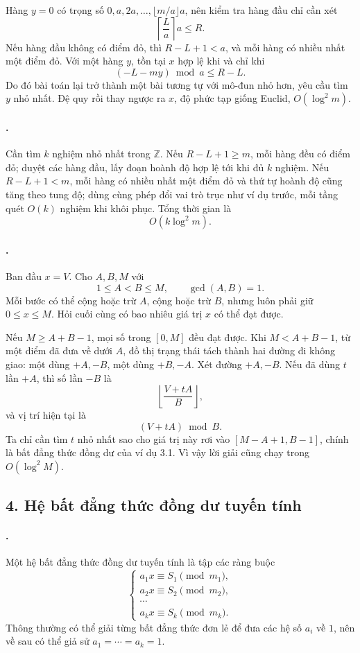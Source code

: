 \documentclass[11pt]{article}
\begin{document}
Hàng \(y=0\) có trọng số \(0,a,2a,\ldots,\lfloor m/a\rfloor a\), nên kiểm tra
hàng đầu chỉ cần xét
\[
  \left\lceil\frac{L}{a}\right\rceil a\le R.
\]
Nếu hàng đầu không có điểm đỏ, thì \(R-L+1<a\), và mỗi hàng có nhiều nhất một
điểm đỏ. Với một hàng \(y\), tồn tại \(x\) hợp lệ khi và chỉ khi
\[
  (-L-my)\bmod a\le R-L.
\]
Do đó bài toán lại trở thành một bài tương tự với mô-đun nhỏ hơn, yêu cầu tìm
\(y\) nhỏ nhất. Đệ quy rồi thay ngược ra \(x\), độ phức tạp giống Euclid,
\(O(\log^2 m)\).

\paragraph{.}
Cần tìm \(k\) nghiệm nhỏ nhất trong \(\mathbb Z\). Nếu \(R-L+1\ge m\), mỗi
hàng đều có điểm đỏ; duyệt các hàng đầu, lấy đoạn hoành độ hợp lệ tới khi đủ
\(k\) nghiệm. Nếu \(R-L+1<m\), mỗi hàng có nhiều nhất một điểm đỏ và thứ tự
hoành độ cũng tăng theo tung độ; dùng cùng phép đổi vai trò trục như ví dụ
trước, mỗi tầng quét \(O(k)\) nghiệm khi khôi phục. Tổng thời gian là
\[
  O(k\log^2 m).
\]

\paragraph{.}
Ban đầu \(x=V\). Cho \(A,B,M\) với
\[
  1\le A<B\le M,\qquad \gcd(A,B)=1.
\]
Mỗi bước có thể cộng hoặc trừ \(A\), cộng hoặc trừ \(B\), nhưng luôn phải giữ
\(0\le x\le M\). Hỏi cuối cùng có bao nhiêu giá trị \(x\) có thể đạt được.

Nếu \(M\ge A+B-1\), mọi số trong \([0,M]\) đều đạt được. Khi
\(M<A+B-1\), từ một điểm đã đưa về dưới \(A\), đồ thị trạng thái tách thành
hai đường đi không giao: một dùng \(+A,-B\), một dùng \(+B,-A\). Xét đường
\(+A,-B\). Nếu đã dùng \(t\) lần \(+A\), thì số lần \(-B\) là
\[
  \left\lfloor\frac{V+tA}{B}\right\rfloor,
\]
và vị trí hiện tại là
\[
  (V+tA)\bmod B.
\]
Ta chỉ cần tìm \(t\) nhỏ nhất sao cho giá trị này rơi vào
\([M-A+1,B-1]\), chính là bất đẳng thức đồng dư của ví dụ 3.1. Vì vậy lời giải
cũng chạy trong \(O(\log^2 M)\).

\subsection*{4. Hệ bất đẳng thức đồng dư tuyến tính}

\paragraph{.}
Một hệ bất đẳng thức đồng dư tuyến tính là tập các ràng buộc
\[
\begin{cases}
  a_1x\equiv S_1\pmod {m_1},\\
  a_2x\equiv S_2\pmod {m_2},\\
  \cdots\\
  a_kx\equiv S_k\pmod {m_k}.
\end{cases}
\]
Thông thường có thể giải từng bất đẳng thức đơn lẻ để đưa các hệ số \(a_i\)
về \(1\), nên về sau có thể giả sử \(a_1=\cdots=a_k=1\).
\end{document}
